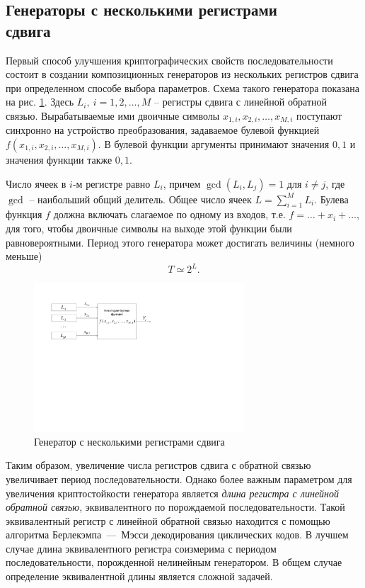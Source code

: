 \subsection[Генераторы с несколькими регистрами сдвига]{Генераторы с несколькими регистрами \protect\\ сдвига}

Первый способ улучшения криптографических свойств последовательности состоит в создании композиционных генераторов из нескольких регистров сдвига при определенном способе выбора параметров. Схема такого генератора показана на рис. \ref{fig:generators}. Здесь $L_i, ~ i = 1, 2, \dots, M$ -- регистры сдвига с линейной обратной связью. Вырабатываемые ими двоичные символы $x_{1,i}, x_{2,i},  \dots,  x_{M,i}$ поступают синхронно на устройство преобразования, задаваемое булевой функцией $f(x_{1,i}, x_{2,i}, \dots, x_{M,i})$. В булевой функции аргументы принимают значения $0,1$ и значения функции также $0,1$.

Число ячеек в $i$-м регистре равно $L_{i}$, причем $\gcd(L_i, L_j)=1$ для $i \neq j$, где  $\gcd$ -- наибольший общий делитель. Общее число ячеек $L = \sum\limits_{i=1}^M L_i$. Булева функция $f$ должна включать слагаемое по одному из входов, т.е. $f = \dots + x_i + \dots$, для того, чтобы двоичные символы на выходе этой функции были равновероятными. Период этого генератора может достигать величины (немного меньше)
    \[ T \simeq 2^L. \]

\begin{figure}[h!]
	\centering
	\includegraphics[width=0.7\textwidth]{pic/generators}
    \caption{Генератор с несколькими регистрами сдвига\label{fig:generators}}
\end{figure}

Таким образом, увеличение числа регистров сдвига с обратной связью увеличивает период последовательности. Однако более важным параметром для увеличения криптостойкости генератора является \emph{ длина регистра с линейной обратной связью}, эквивалентного по порождаемой последовательности. Такой эквивалентный регистр с линейной обратной связью находится с помощью алгоритма Берлекэмпа~---~Мэсси декодирования циклических кодов. В лучшем случае длина эквивалентного регистра соизмерима с периодом последовательности, порожденной нелинейным генератором. В общем случае определение эквивалентной длины является сложной задачей.
